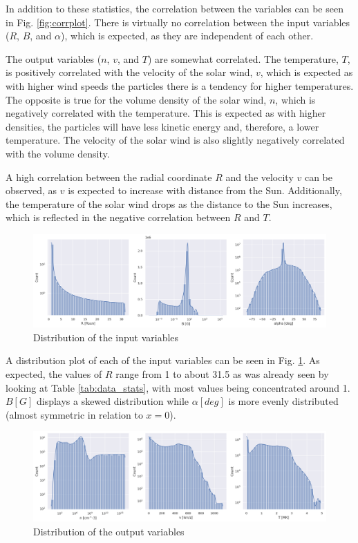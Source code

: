 In addition to these statistics, the correlation between the variables can be seen in Fig. \ref{fig:corrplot}. There is virtually no correlation between the input variables ($R$, $B$, and $\alpha$), which is expected, as they are independent of each other. 

The output variables ($n$, $v$, and $T$) are somewhat correlated. The temperature, $T$, is positively correlated with the velocity of the solar wind, $v$, which is expected as with higher wind speeds the particles there is a tendency for higher temperatures. The opposite is true for the volume density of the solar wind, $n$, which is negatively correlated with the temperature. This is expected as with higher densities, the particles will have less kinetic energy and, therefore, a lower temperature. The velocity of the solar wind is also slightly negatively correlated with the volume density.

A high correlation between the radial coordinate $R$ and the velocity $v$ can be observed, as $v$ is expected to increase with distance from the Sun. Additionally, the temperature of the solar wind drops as the distance to the Sun increases, which is reflected in the negative correlation between $R$ and $T$.

\begin{figure}
    \centering
    \includegraphics[width=\textwidth]{figures/input_vars_distribution.png}
    \caption{Distribution of the input variables}
    \label{fig:input_vars_distr}
\end{figure}

A distribution plot of each of the input variables can be seen in Fig. \ref{fig:input_vars_distr}. As expected, the values of $R$ range from 1 to about 31.5 as was already seen by looking at Table \ref{tab:data_stats}, with most values being concentrated around 1. $B [G]$ displays a skewed distribution while $\alpha [deg]$ is more evenly distributed (almost symmetric in relation to $x=0$).


\begin{figure}
    \centering
    \includegraphics[width=\textwidth]{figures/output_vars_distribution.png}
    \caption{Distribution of the output variables}
    \label{fig:output_vars_distr}
\end{figure}

